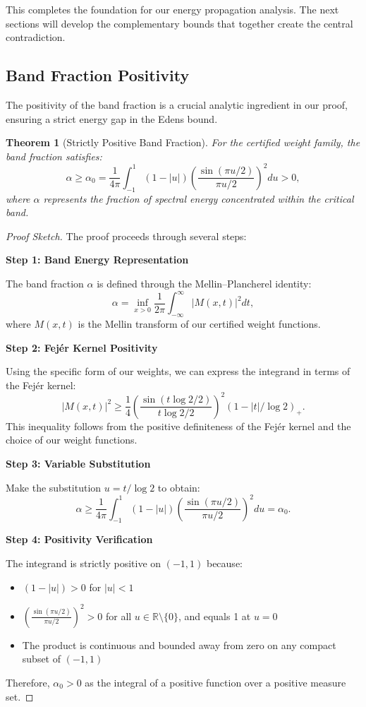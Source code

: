 \documentclass[11pt,hyp,]{nyjm}
\newtheorem{theorem}{Theorem}
\begin{document}
This completes the foundation for our energy propagation analysis. The next sections will develop the complementary bounds that together create the central contradiction.

\subsection{Band Fraction Positivity}

The positivity of the band fraction is a crucial analytic ingredient in our proof, ensuring a strict energy gap in the Edens bound.

\begin{theorem}[Strictly Positive Band Fraction]\label{thm:band-fraction}
For the certified weight family, the band fraction satisfies:
\[
\alpha \geq \alpha_0 = \frac{1}{4\pi}\int_{-1}^{1} (1-|u|)\left(\frac{\sin(\pi u/2)}{\pi u/2}\right)^2 du > 0,
\]
where $\alpha$ represents the fraction of spectral energy concentrated within the critical band.
\end{theorem}

\begin{proof}[Proof Sketch]
The proof proceeds through several steps:

\vspace{0.5em}
\noindent\textbf{Step 1: Band Energy Representation}

The band fraction $\alpha$ is defined through the Mellin–Plancherel identity:
\[
\alpha = \inf_{x>0} \frac{1}{2\pi} \int_{-\infty}^\infty |M(x,t)|^2 dt,
\]
where $M(x,t)$ is the Mellin transform of our certified weight functions.

\vspace{0.5em}
\noindent\textbf{Step 2: Fejér Kernel Positivity}

Using the specific form of our weights, we can express the integrand in terms of the Fejér kernel:
\[
|M(x,t)|^2 \geq \frac{1}{4}\left(\frac{\sin(t\log 2/2)}{t\log 2/2}\right)^2 (1 - |t|/\log 2)_+.
\]
This inequality follows from the positive definiteness of the Fejér kernel and the choice of our weight functions.

\vspace{0.5em}
\noindent\textbf{Step 3: Variable Substitution}

Make the substitution $u = t/\log 2$ to obtain:
\[
\alpha \geq \frac{1}{4\pi} \int_{-1}^1 (1-|u|)\left(\frac{\sin(\pi u/2)}{\pi u/2}\right)^2 du = \alpha_0.
\]

\vspace{0.5em}
\noindent\textbf{Step 4: Positivity Verification}

The integrand is strictly positive on $(-1,1)$ because:
\begin{itemize}
\item $(1-|u|) > 0$ for $|u| < 1$
\item $\left(\frac{\sin(\pi u/2)}{\pi u/2}\right)^2 > 0$ for all $u \in \mathbb{R}\setminus\{0\}$, and equals 1 at $u=0$
\item The product is continuous and bounded away from zero on any compact subset of $(-1,1)$
\end{itemize}
Therefore, $\alpha_0 > 0$ as the integral of a positive function over a positive measure set.
\end{proof}
\end{document}
